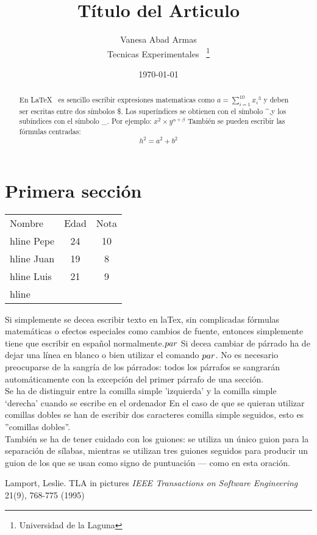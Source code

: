 \documentclass[a4paper,12pt]{article}
\begin{document}
\title{Título del Articulo}
\author{Vanesa Abad Armas\\
	Tecnicas Experimentales ~\footnote{Universidad de la Laguna}
	}
\date{\today}
\maketitle
\begin{abstract}
   En \LaTeX{}~\cite{Lam:86} es sencillo escribir expresiones
matematicas como $a=\sum_{i=1}^{10}{x_i}^{3} $
y deben ser escritas entre dos símbolos \$.
Los superíndices se obtienen con el símbolo \^{},y
los subíndices con el símbolo \_.
Por ejemplo: $x^2 \times y^{\alpha + \beta}$
También se pueden escribir las fórmulas centradas:
\[h^2=a^2 + b^2\]
\end{abstract}
\section{Primera sección}
\bigskip
\begin{tabular}{|l|c|c|}
\hline
  Nombre & Edad & Nota \\hline
  Pepe	 &  24  & 10	\\hline
  Juan	 &  19  & 8	\\hline
  Luis   &  21  & 9 	\\hline
\end{tabular}
\bigskip
Si simplemente se decea escribir texto en laTex,
sin complicadas f\'ormulas matem\'aticas o efectos especiales
como cambios de fuente, entonces simplemente tiene que escribir
en español normalmente.$\\par$
Si decea cambiar de párrado ha de dejar una línea en blanco o bien
utilizar el comando $\\par$.
No es necesario preocuparse de la sangría de los párrados:
todos los párrafos se sangrarán automáticamente con la excepción
del primer párrafo de una sección.\\
Se ha de distinguir entre la comilla simple 'izquierda'
y la comilla simple `derecha' cuando se escribe en el ordenador
En el caso de que se quieran utilizar comillas dobles se han de
escribir dos caracteres comilla simple seguidos, esto es
''comillas dobles''.\\
También se ha de tener cuidado con los guiones: se utiliza un único
guion para la separación de sílabas, mientras se utilizan
tres guiones seguidos para producir un guion de los que se usan 
como signo de puntuación --- como en esta oración. 

\begin{thebibliography}{00}
    Lamport, Leslie.
    TLA in pictures
    \emph{IEEE Transactions on Software Engineering}
    21(9), 768-775
    (1995)
\end{thebibliography}
\end{document}
